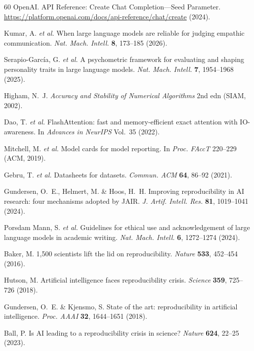 \documentclass[sn-nature]{sn-jnl}
\begin{document}
\begin{thebibliography}{60}
OpenAI. API Reference: Create Chat Completion---Seed Parameter.
\url{https://platform.openai.com/docs/api-reference/chat/create} (2024).

Kumar, A. \emph{et al.}
When large language models are reliable for judging empathic communication.
\emph{Nat. Mach. Intell.} \textbf{8}, 173--185 (2026).

Serapio-Garc\'{i}a, G. \emph{et al.}
A psychometric framework for evaluating and shaping personality traits in large language models.
\emph{Nat. Mach. Intell.} \textbf{7}, 1954--1968 (2025).

Higham, N.~J.
\emph{Accuracy and Stability of Numerical Algorithms} 2nd edn (SIAM, 2002).

Dao, T. \emph{et al.}
FlashAttention: fast and memory-efficient exact attention with IO-awareness.
In \emph{Advances in NeurIPS} Vol.~35 (2022).

Mitchell, M. \emph{et al.}
Model cards for model reporting.
In \emph{Proc. FAccT} 220--229 (ACM, 2019).

Gebru, T. \emph{et al.}
Datasheets for datasets.
\emph{Commun. ACM} \textbf{64}, 86--92 (2021).

Gundersen, O.~E., Helmert, M. \& Hoos, H.~H.
Improving reproducibility in AI research: four mechanisms adopted by JAIR.
\emph{J. Artif. Intell. Res.} \textbf{81}, 1019--1041 (2024).

Porsdam Mann, S. \emph{et al.}
Guidelines for ethical use and acknowledgement of large language models in academic writing.
\emph{Nat. Mach. Intell.} \textbf{6}, 1272--1274 (2024).

Baker, M.
1,500 scientists lift the lid on reproducibility.
\emph{Nature} \textbf{533}, 452--454 (2016).

Hutson, M.
Artificial intelligence faces reproducibility crisis.
\emph{Science} \textbf{359}, 725--726 (2018).

Gundersen, O.~E. \& Kjensmo, S.
State of the art: reproducibility in artificial intelligence.
\emph{Proc. AAAI} \textbf{32}, 1644--1651 (2018).

Ball, P.
Is AI leading to a reproducibility crisis in science?
\emph{Nature} \textbf{624}, 22--25 (2023).


\end{thebibliography}
\end{document}
